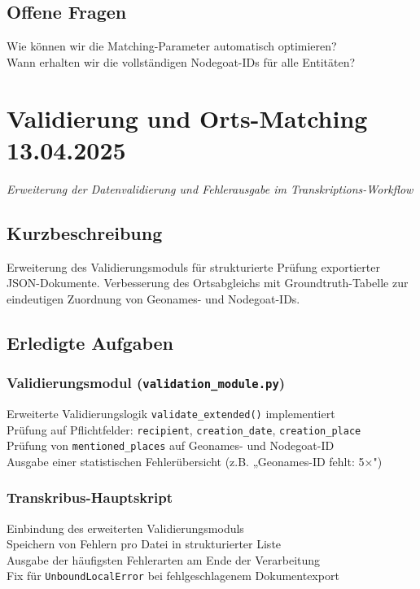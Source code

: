 \documentclass{article}
\begin{document}
\subsection*{Offene Fragen}
 Wie können wir die Matching-Parameter automatisch optimieren?\\
 Wann erhalten wir die vollständigen Nodegoat-IDs für alle Entitäten?\\

\noindent\hrulefill

\section{Validierung und Orts-Matching \small 13.04.2025}
\small\textit{Erweiterung der Datenvalidierung und Fehlerausgabe im Transkriptions-Workflow}\\

\subsection*{Kurzbeschreibung}

Erweiterung des Validierungsmoduls für strukturierte Prüfung exportierter JSON-Dokumente. Verbesserung des Ortsabgleichs mit Groundtruth-Tabelle zur eindeutigen Zuordnung von Geonames- und Nodegoat-IDs.

\subsection*{Erledigte Aufgaben}
\subsubsection*{\small Validierungsmodul (\texttt{validation\_module.py})}
 Erweiterte Validierungslogik \texttt{validate\_extended()} implementiert\\
 Prüfung auf Pflichtfelder: \texttt{recipient}, \texttt{creation\_date}, \texttt{creation\_place}\\
 Prüfung von \texttt{mentioned\_places} auf Geonames- und Nodegoat-ID\\
 Ausgabe einer statistischen Fehlerübersicht (z.B. „Geonames-ID fehlt: 5×")

\subsubsection*{\small Transkribus-Hauptskript}
 Einbindung des erweiterten Validierungsmoduls\\
 Speichern von Fehlern pro Datei in strukturierter Liste\\
 Ausgabe der häufigsten Fehlerarten am Ende der Verarbeitung\\
 Fix für \texttt{UnboundLocalError} bei fehlgeschlagenem Dokumentexport
\end{document}
